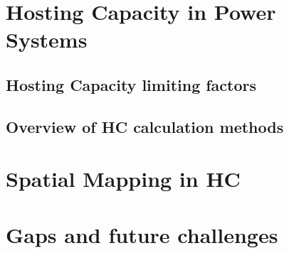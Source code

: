 



\section{Hosting Capacity in Power Systems}

\subsection{Hosting Capacity limiting factors}
\cite{IEEEDataPort}

\subsection{Overview of HC calculation methods}





\section{Spatial Mapping in HC}




\section{Gaps and future challenges}



